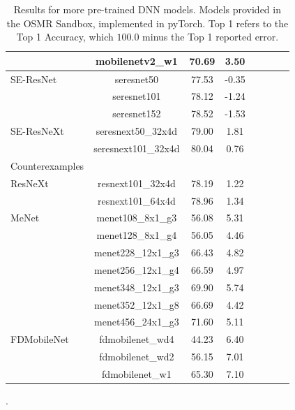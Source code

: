 {\begin{table}[!htb]
\begin{center}
\begin{tabular}{|p{1in}|c|c|c|c|c|c|c|}
& mobilenetv2\_w1 & 70.69 & 3.50 \\
\hline
SE-ResNet
& seresnet50 & 77.53 & -0.35 \\
& seresnet101 & 78.12 & -1.24 \\
& seresnet152 & 78.52 & -1.53 \\
\hline
SE-ResNeXt
& seresnext50\_32x4d & 79.00 & 1.81 \\
& seresnext101\_32x4d & 80.04 & 0.76 \\
\hline
Counterexamples & & &  \\
\hline
ResNeXt
& resnext101\_32x4d & 78.19 & 1.22 \\
& resnext101\_64x4d & 78.96 & 1.34 \\
\hline
MeNet
& menet108\_8x1\_g3 & 56.08 & 5.31 \\
& menet128\_8x1\_g4 & 56.05 & 4.46 \\
& menet228\_12x1\_g3 & 66.43 & 4.82 \\
& menet256\_12x1\_g4 & 66.59 & 4.97 \\
& menet348\_12x1\_g3 & 69.90 & 5.74 \\
& menet352\_12x1\_g8 & 66.69 & 4.42 \\
& menet456\_24x1\_g3 & 71.60 & 5.11 \\
\hline
FDMobileNet
& fdmobilenet\_wd4 & 44.23 & 6.40 \\
& fdmobilenet\_wd2 & 56.15 & 7.01 \\
& fdmobilenet\_w1 & 65.30 & 7.10 \\
\hline
\end{tabular}
\end{center}
\caption{Results for more pre-trained DNN models.  Models provided in the OSMR Sandbox, implemented in pyTorch. Top 1 refers to the Top 1 Accuracy, which $100.0$ minus the Top 1 reported error.}
\label{table:models_more}. 
\end{table}


}
